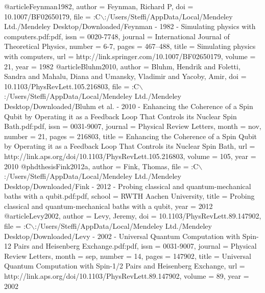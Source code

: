 @article{Feynman1982,
author = {Feynman, Richard P},
doi = {10.1007/BF02650179},
file = {:C$\backslash$:/Users/Steffi/AppData/Local/Mendeley Ltd./Mendeley Desktop/Downloaded/Feynman - 1982 - Simulating physics with computers.pdf:pdf},
issn = {0020-7748},
journal = {International Journal of Theoretical Physics},
number = {6-7},
pages = {467--488},
title = {{Simulating physics with computers}},
url = {http://link.springer.com/10.1007/BF02650179},
volume = {21},
year = {1982}
}
@article{Bluhm2010,
author = {Bluhm, Hendrik and Foletti, Sandra and Mahalu, Diana and Umansky, Vladimir and Yacoby, Amir},
doi = {10.1103/PhysRevLett.105.216803},
file = {:C$\backslash$:/Users/Steffi/AppData/Local/Mendeley Ltd./Mendeley Desktop/Downloaded/Bluhm et al. - 2010 - Enhancing the Coherence of a Spin Qubit by Operating it as a Feedback Loop That Controls its Nuclear Spin Bath.pdf:pdf},
issn = {0031-9007},
journal = {Physical Review Letters},
month = {nov},
number = {21},
pages = {216803},
title = {{Enhancing the Coherence of a Spin Qubit by Operating it as a Feedback Loop That Controls its Nuclear Spin Bath}},
url = {http://link.aps.org/doi/10.1103/PhysRevLett.105.216803},
volume = {105},
year = {2010}
}
@phdthesis{Fink2012a,
author = {Fink, Thomas},
file = {:C$\backslash$:/Users/Steffi/AppData/Local/Mendeley Ltd./Mendeley Desktop/Downloaded/Fink - 2012 - Probing classical and quantum-mechanical baths with a qubit.pdf:pdf},
school = {RWTH Aachen University},
title = {{Probing classical and quantum-mechanical baths with a qubit}},
year = {2012}
}
@article{Levy2002,
author = {Levy, Jeremy},
doi = {10.1103/PhysRevLett.89.147902},
file = {:C$\backslash$:/Users/Steffi/AppData/Local/Mendeley Ltd./Mendeley Desktop/Downloaded/Levy - 2002 - Universal Quantum Computation with Spin-12 Pairs and Heisenberg Exchange.pdf:pdf},
issn = {0031-9007},
journal = {Physical Review Letters},
month = {sep},
number = {14},
pages = {147902},
title = {{Universal Quantum Computation with Spin-1/2 Pairs and Heisenberg Exchange}},
url = {http://link.aps.org/doi/10.1103/PhysRevLett.89.147902},
volume = {89},
year = {2002}
}
